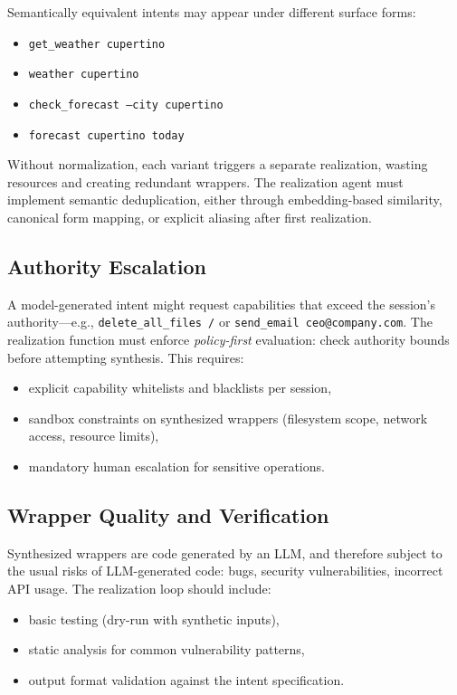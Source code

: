 \documentclass[11pt]{article}
\begin{document}
Semantically equivalent intents may appear under different surface forms:
\begin{itemize}[leftmargin=*]
  \item \texttt{get\_weather cupertino}
  \item \texttt{weather cupertino}
  \item \texttt{check\_forecast --city cupertino}
  \item \texttt{forecast cupertino today}
\end{itemize}

Without normalization, each variant triggers a separate realization, wasting resources and creating redundant wrappers.
The realization agent must implement semantic deduplication, either through embedding-based similarity, canonical form mapping, or explicit aliasing after first realization.

\subsection{Authority Escalation}

A model-generated intent might request capabilities that exceed the session's authority---e.g., \texttt{delete\_all\_files /} or \texttt{send\_email ceo@company.com}.
The realization function must enforce \emph{policy-first} evaluation: check authority bounds before attempting synthesis.
This requires:
\begin{itemize}[leftmargin=*]
  \item explicit capability whitelists and blacklists per session,
  \item sandbox constraints on synthesized wrappers (filesystem scope, network access, resource limits),
  \item mandatory human escalation for sensitive operations.
\end{itemize}

\subsection{Wrapper Quality and Verification}

Synthesized wrappers are code generated by an LLM, and therefore subject to the usual risks of LLM-generated code: bugs, security vulnerabilities, incorrect API usage.
The realization loop should include:
\begin{itemize}[leftmargin=*]
  \item basic testing (dry-run with synthetic inputs),
  \item static analysis for common vulnerability patterns,
  \item output format validation against the intent specification.
\end{itemize}
\end{document}
